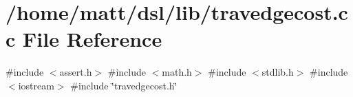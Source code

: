 \section{/home/matt/dsl/lib/travedgecost.cc \-File \-Reference}
\label{travedgecost_8cc}
{\ttfamily \#include $<$assert.\-h$>$}\*
{\ttfamily \#include $<$math.\-h$>$}\*
{\ttfamily \#include $<$stdlib.\-h$>$}\*
{\ttfamily \#include $<$iostream$>$}\*
{\ttfamily \#include \char`\"{}travedgecost.\-h\char`\"{}}\*
